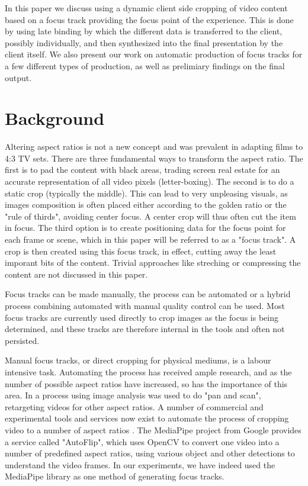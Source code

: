 \documentclass[sigconf, review=false]{acmart}
\begin{document}
In this paper we discuss using a dynamic client side cropping of video content
based on a focus track providing the focus point of the experience. This is
done by using late binding by which the different data is transferred to the
client, possibly individually, and then synthesized into the final
presentation by the client itself. We also present our work on automatic
production of focus tracks for a few different types of production, as well
as prelimiary findings on the final output.


\section{Background}

Altering aspect ratios is not a new concept and was prevalent in adapting
films to 4:3 TV sets. There are three fundamental ways to transform the
aspect ratio. The first is to pad the content with black areas, trading
screen real estate for an accurate representation of all video pixels
(letter-boxing). The second is to do a static crop (typically the middle).
This can lead to very unpleasing visuals, as images composition is often
placed either according to the golden ratio or the "rule of thirds", avoiding
center focus. A center crop will thus often cut the item in focus. The third
option is to create positioning data for the focus point for each frame or
scene, which in this paper will be referred to as a "focus track". A crop is
then created using this focus track, in effect, cutting away the least
imporant bits of the content. Trivial approaches like streching or
compressing the content are not discussed in this paper.

Focus tracks can be made manually, the process can be automated or a hybrid
process combining automated with manual quality control can be used. Most
focus tracks are currently used directly to crop images as the focus is being
determined, and these tracks are therefore internal in the tools and often
not persisted.

Manual focus tracks, or direct cropping for physical mediums, is a labour
intensive task. Automating the process has received ample research, and as
the number of possible aspect ratios have increased, so has the importance of
this area. In \cite{liu2006video} a process using image analysis was used to
do "pan and scan", retargeting videos for other aspect ratios. A number of
commercial and experimental tools and services now exist to automate the
process of cropping video to a number of aspect ratios \cite
{adobe_premiere,mediapipe,kamua}. The MediaPipe\cite{mediapipe} project from
Google provides a service called "AutoFlip", which uses OpenCV to convert one
video into a number of predefined aspect ratios, using various object and
other detections to understand the video frames. In our experiments, we have
indeed used the MediaPipe library as one method of generating focus tracks.
\end{document}
